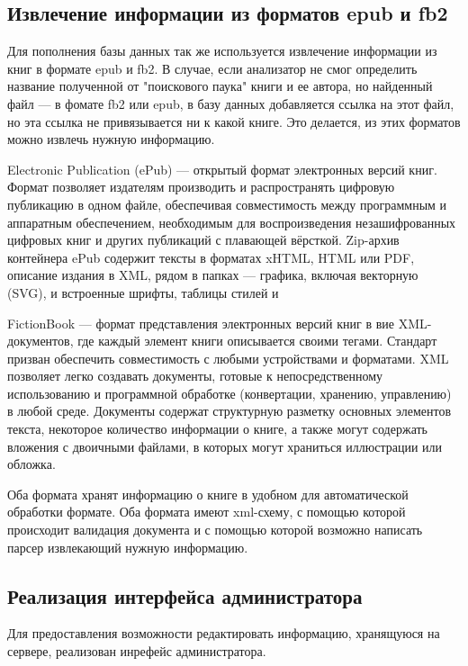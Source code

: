 \documentclass[a4paper]{report}
\begin{document}

\subsection{Извлечение информации из форматов epub и fb2}

Для пополнения базы данных так же используется извлечение информации из книг в формате epub и fb2. В случае, если анализатор не смог определить название полученной от "поискового паука" книги и ее автора, но найденный файл --- в фомате fb2 или epub, в базу данных добавляется ссылка на этот файл, но эта ссылка не привязывается ни к какой книге. Это делается, \tk из этих форматов можно извлечь нужную информацию. 

Electronic Publication (ePub) — открытый формат электронных версий книг. Формат позволяет издателям производить и распространять цифровую публикацию в одном файле, обеспечивая совместимость между программным и аппаратным обеспечением, необходимым для воспроизведения незашифрованных цифровых книг и других публикаций с плавающей вёрсткой.
Zip-архив контейнера ePub содержит тексты в форматах xHTML, HTML или PDF, описание издания в XML, рядом в папках — графика, включая векторную (SVG), и встроенные шрифты, таблицы стилей и \td 

FictionBook — формат представления электронных версий книг в вие XML-документов, где каждый элемент книги описывается своими тегами. Стандарт призван обеспечить совместимость с любыми устройствами и форматами. XML позволяет легко создавать документы, готовые к непосредственному использованию и программной обработке (конвертации, хранению, управлению) в любой среде. Документы содержат структурную разметку основных элементов текста, некоторое количество информации о книге, а также могут содержать вложения с двоичными файлами, в которых могут храниться иллюстрации или обложка.

Оба формата хранят информацию о книге в удобном для автоматической обработки формате. Оба формата имеют xml-схему, с помощью которой происходит валидация документа и с помощью которой возможно написать парсер извлекающий нужную информацию.

\subsection{Реализация интерфейса администратора}

Для предоставления возможности редактировать информацию, хранящуюся на сервере, реализован инрефейс администратора.
\end{document}
